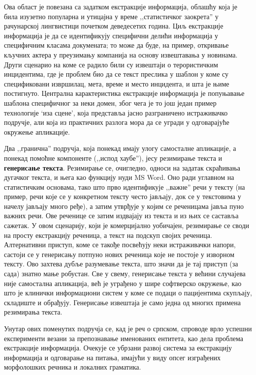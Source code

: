 \begin{multicols}{2}

Ова област је повезана са задатком екстракције информација, облашћу која је била изузетно популарна и утицајна у време ,,статистичког заокрета'' у рачунарској лингвистици почетком деведесетих година. Циљ екстракције информација је да се идентификују специфични делићи информација у специфичним класама докумената; то може да буде, на пример, откривање кључних актера у преузимању компанија на основу извештавања у новинама. Други сценарио на коме се радило били су извештаји о терористичким инцидентима, где је проблем био да се текст преслика у шаблон у коме су спецификовани извршилац, мета, време и место инцидента, и шта је њиме постигнуто. Централна карактеристика екстракције информација је попуњавање шаблона специфичног за неки домен, због чега је то још један пример технологије ‘иза сцене’, која представља јасно разграничено истраживачко подручје, али која из практичних разлога мора да се угради у одговарајуће окружење апликације.  

Два ,,гранична'' подручја, која понекад имају улогу самосталне апликације, а понекад помоћне компоненте (,,испод хаубе''), јесу резимирање текста и \textbf{генерисање текста}. Резимирање се, очигледно, односи на задатак скраћивања дугачког текста, и њега као функцију нуди MS Word. Оно ради углавном на статистичким основама, тако што прво идентификује ,,важне'' речи у тексту (на пример, речи које се у конкретном тексту често јављају, док се у текстовима у начелу јављају много ређе), а затим утврђује у којим се реченицама јавља пуно важних речи. Ове реченице се затим издвајају из текста и из њих се саставља сажетак. У овом сценарију, који је комерцијално уобичајен, резимирање се своди на просту екстракцију реченица, а текст на подскуп својих реченица. Алтернативни приступ, коме се такође посвећују неки истраживачки напори, састоји се у генерисању потпуно нових реченица које не постоје у изворном тексту. Ово захтева дубље разумевање текста, што значи да је тај приступ (за сада) знатно мање робустан. Све у свему, генерисање текста у већини случајева није самостална апликација, већ је уграђено у шире софтверско окружење, као што је клинички информациони систем у коме се подаци о пацијентима скупљају, складиште и обрађују. Генерисање извештаја је само једна од многих примена резимирања текста. 

Унутар ових поменутих подручја се, кад је реч о српском, спроводе врло успешни експерименти везани за препознавање именованих ентитета, као дела проблема екстракције информација. Очекује се убрзани развој система за екстракцију информација и одговарање на питања, имајући у виду опсег изграђених морфолошких речника и локалних граматика. 


\end{multicols}
